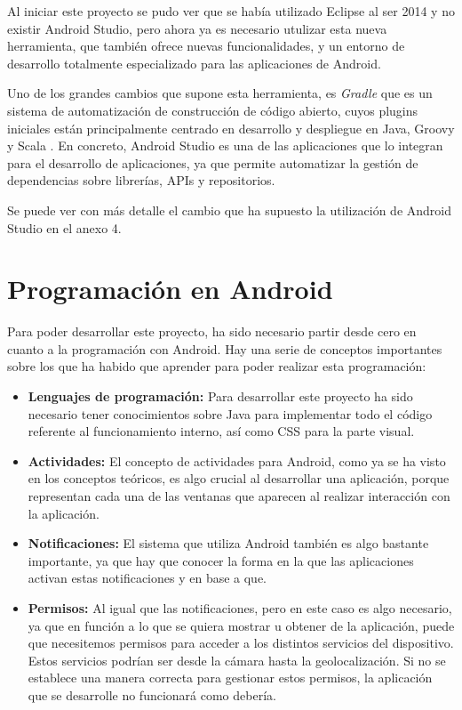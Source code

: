 Al iniciar este proyecto se pudo ver que se había utilizado Eclipse al ser 2014 y no existir Android Studio, pero ahora ya es necesario utulizar esta nueva herramienta, que también ofrece nuevas funcionalidades, y un entorno de desarrollo totalmente especializado para las aplicaciones de Android. 

Uno de los grandes cambios que supone esta herramienta, es \textit{Gradle} \cite{gradle2} que es un sistema de automatización de construcción de código abierto, cuyos plugins iniciales están principalmente centrado en desarrollo y despliegue en Java, Groovy y Scala \cite{gradle1}. En concreto, Android Studio es una de las aplicaciones que lo integran para el desarrollo de aplicaciones, ya que permite automatizar la gestión de dependencias sobre librerías, APIs y repositorios.

Se puede ver con más detalle el cambio que ha supuesto la utilización de Android Studio en el anexo 4.

\section{Programación en Android}

Para poder desarrollar este proyecto, ha sido necesario partir desde cero en cuanto a la programación con Android. Hay una serie de conceptos importantes sobre los que ha habido que aprender para poder realizar esta programación:

\begin{itemize}
\item \textbf{Lenguajes de programación:} Para desarrollar este proyecto ha sido necesario tener conocimientos sobre Java para implementar todo el código referente al funcionamiento interno, así como CSS para la parte visual.
\item \textbf{Actividades:} El concepto de actividades para Android, como ya se ha visto en los conceptos teóricos, es algo crucial al desarrollar una aplicación, porque representan cada una de las ventanas que aparecen al realizar interacción con la aplicación.
\item \textbf{Notificaciones:} El sistema que utiliza Android también es algo bastante importante, ya que hay que conocer la forma en la que las aplicaciones activan estas notificaciones y en base a que.
\item \textbf{Permisos:} Al igual que las notificaciones, pero en este caso es algo necesario, ya que en función a lo que se quiera mostrar u obtener de la aplicación, puede que necesitemos permisos para acceder a los distintos servicios del dispositivo. Estos servicios podrían ser desde la cámara hasta la geolocalización. Si no se establece una manera correcta para gestionar estos permisos, la aplicación que se desarrolle no funcionará como debería.
\end{itemize}

